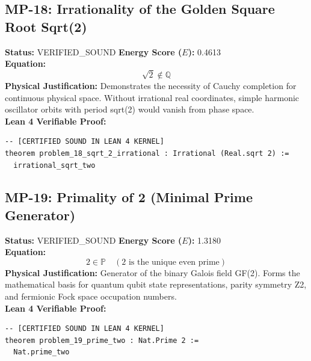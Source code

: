 \documentclass[11pt, a4paper]{article}
\begin{document}
\subsection{MP-18: Irrationality of the Golden Square Root Sqrt(2)}
\textbf{Status:} VERIFIED\_SOUND \hfill \textbf{Energy Score ($E$):} 0.4613\\
\textbf{Equation:}
\begin{equation*}
\sqrt{2} \notin \mathbb{Q}
\end{equation*}
\textbf{Physical Justification:} Demonstrates the necessity of Cauchy completion for continuous physical space. Without irrational real coordinates, simple harmonic oscillator orbits with period sqrt(2) would vanish from phase space.\\
\textbf{Lean 4 Verifiable Proof:}
\begin{verbatim}
-- [CERTIFIED SOUND IN LEAN 4 KERNEL]
theorem problem_18_sqrt_2_irrational : Irrational (Real.sqrt 2) :=
  irrational_sqrt_two

\end{verbatim}

\subsection{MP-19: Primality of 2 (Minimal Prime Generator)}
\textbf{Status:} VERIFIED\_SOUND \hfill \textbf{Energy Score ($E$):} 1.3180\\
\textbf{Equation:}
\begin{equation*}
2 \in \mathbb{P} \quad (2 \text{ is the unique even prime})
\end{equation*}
\textbf{Physical Justification:} Generator of the binary Galois field GF(2). Forms the mathematical basis for quantum qubit state representations, parity symmetry Z2, and fermionic Fock space occupation numbers.\\
\textbf{Lean 4 Verifiable Proof:}
\begin{verbatim}
-- [CERTIFIED SOUND IN LEAN 4 KERNEL]
theorem problem_19_prime_two : Nat.Prime 2 :=
  Nat.prime_two

\end{verbatim}
\end{document}

